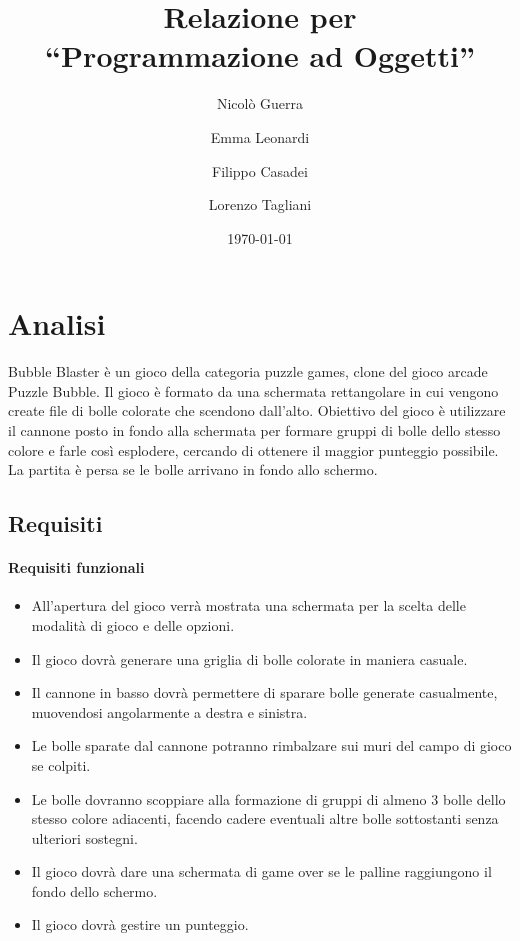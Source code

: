 \documentclass[a4paper,12pt]{report}
\title{Relazione per\\``Programmazione ad Oggetti''}
\author{Nicolò Guerra \and
Emma Leonardi \and 
Filippo Casadei \and
Lorenzo Tagliani}
\date{\today}
\begin{document}
 

\maketitle

\tableofcontents

\chapter{Analisi}

Bubble Blaster è un gioco della categoria puzzle games, clone del gioco arcade Puzzle Bubble. Il gioco è formato da una schermata
rettangolare in cui vengono create file di bolle colorate che scendono dall'alto. Obiettivo del gioco è utilizzare il cannone
posto in fondo alla schermata per formare gruppi di bolle dello stesso colore e farle così esplodere, cercando di ottenere il maggior
punteggio possibile. La partita è persa se le bolle arrivano in fondo allo schermo.

\section{Requisiti}

\subsubsection{Requisiti funzionali}
\begin{itemize}
	\item All'apertura del gioco verrà mostrata una schermata per la scelta delle modalità di gioco e delle opzioni.
	\item Il gioco dovrà generare una griglia di bolle colorate in maniera casuale.
	\item Il cannone in basso dovrà permettere di sparare bolle generate casualmente, muovendosi angolarmente a destra e sinistra.
	\item Le bolle sparate dal cannone potranno rimbalzare sui muri del campo di gioco se colpiti.
	\item Le bolle dovranno scoppiare alla formazione di gruppi di almeno 3 bolle dello stesso colore adiacenti, facendo cadere eventuali altre bolle sottostanti senza ulteriori sostegni.
	\item Il gioco dovrà dare una schermata di game over se le palline raggiungono il fondo dello schermo.
	\item Il gioco dovrà gestire un punteggio.
\end{itemize}
\end{document}

